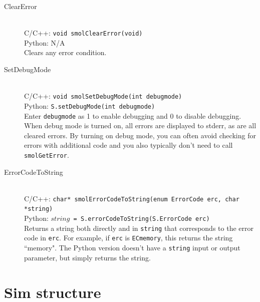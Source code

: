 \documentclass {scrbook}
\newcommand {\ttt} {\texttt}
\begin{document}
\begin{description}
\item[ClearError]
\hfill \\
C/C++: \ttt{void smolClearError(void)}\\
Python: N/A\\
Clears any error condition.

\item[SetDebugMode]
\hfill \\
C/C++: \ttt{void smolSetDebugMode(int debugmode)}\\
Python: \ttt{S.setDebugMode(int debugmode)}\\
Enter \ttt{debugmode} as 1 to enable debugging and 0 to disable debugging. When debug mode is turned on, all errors are displayed to stderr, as are all cleared errors. By turning on debug mode, you can often avoid checking for errors with additional code and you also typically don't need to call \ttt{smolGetError}.

\item[ErrorCodeToString]
\hfill \\
C/C++: \ttt{char* smolErrorCodeToString(enum ErrorCode erc, char *string)}\\
Python: $string$\ttt{ = S.errorCodeToString(S.ErrorCode erc)}\\
Returns a string both directly and in \ttt{string} that corresponds to the error code in \ttt{erc}. For example, if \ttt{erc} is \ttt{ECmemory}, this returns the string ``memory". The Python version doesn't have a \ttt{string} input or output parameter, but simply returns the string.

\end{description}

\section{Sim structure}
\end{document}
